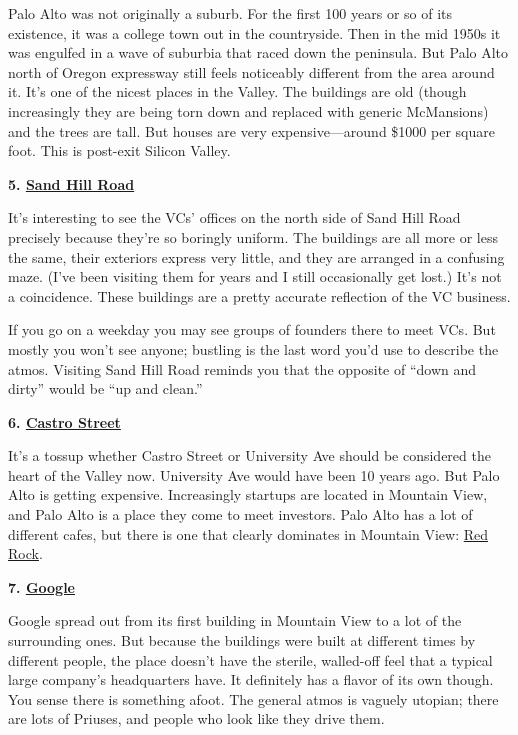 \documentclass[12pt]{book}
\begin{document}
Palo Alto was not originally a suburb. For the first 100 years or so of
its existence, it was a college town out in the countryside. Then in the
mid 1950s it was engulfed in a wave of suburbia that raced down the
peninsula. But Palo Alto north of Oregon expressway still feels
noticeably different from the area around it. It's one of the nicest
places in the Valley. The buildings are old (though increasingly they
are being torn down and replaced with generic McMansions) and the trees
are tall. But houses are very expensive---around \$1000 per square foot.
This is post-exit Silicon Valley.

\textbf{5.
\href{http://maps.google.com/maps?q=2900+sand+hill+road+menlo+park}{Sand
Hill Road}}

It's interesting to see the VCs' offices on the north side of Sand Hill
Road precisely because they're so boringly uniform. The buildings are
all more or less the same, their exteriors express very little, and they
are arranged in a confusing maze. (I've been visiting them for years and
I still occasionally get lost.) It's not a coincidence. These buildings
are a pretty accurate reflection of the VC business.

If you go on a weekday you may see groups of founders there to meet VCs.
But mostly you won't see anyone; bustling is the last word you'd use to
describe the atmos. Visiting Sand Hill Road reminds you that the
opposite of ``down and dirty'' would be ``up and clean.''

\textbf{6.
\href{http://maps.google.com/maps?q=castro+and+villa+mountain+view}{Castro
Street}}

It's a tossup whether Castro Street or University Ave should be
considered the heart of the Valley now. University Ave would have been
10 years ago. But Palo Alto is getting expensive. Increasingly startups
are located in Mountain View, and Palo Alto is a place they come to meet
investors. Palo Alto has a lot of different cafes, but there is one that
clearly dominates in Mountain View:
\href{http://maps.google.com/places/us/ca/mountain-view/castro-st/201/-red-rock-coffee}{Red
Rock}.

\textbf{7.
\href{http://maps.google.com/maps?q=charleston+road+mountain+view}{Google}}

Google spread out from its first building in Mountain View to a lot of
the surrounding ones. But because the buildings were built at different
times by different people, the place doesn't have the sterile,
walled-off feel that a typical large company's headquarters have. It
definitely has a flavor of its own though. You sense there is something
afoot. The general atmos is vaguely utopian; there are lots of Priuses,
and people who look like they drive them.
\end{document}
